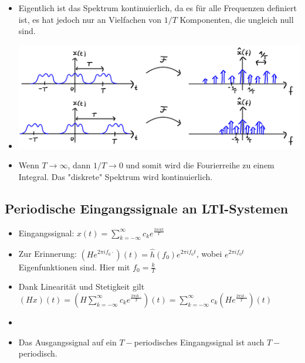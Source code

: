 \documentclass[11pt]{article}
\begin{document}
{\begin{itemize}[leftmargin=0pt]
\begin{itemize}
\begin{center}
        \end{center}
        \item[] Eigentlich ist das Spektrum kontinuierlich, da es für alle Frequenzen definiert ist, es hat jedoch nur an Vielfachen von $1/T$ Komponenten, die ungleich null sind.
        \item[] \begin{center}
            \includegraphics[width=0.8\linewidth]{docimgs/T_increase.jpg}
        \end{center}
        \item[] Wenn $T \to \infty$, dann $1/T \to 0$ und somit wird die Fourierreihe zu einem Integral. Das "diskrete" Spektrum wird kontinuierlich.
    \end{itemize}
     
\end{itemize}

\pagebreak

\subsection*{Periodische Eingangssignale an LTI-Systemen}
\begin{itemize}[leftmargin=0pt]
    \item[] Eingangssignal: $x(t) = \displaystyle\sum_{k = -\infty}^{\infty} c_k e^{\frac{2 \pi i k t}{T}}$
    \item[] Zur Erinnerung: $\left(H \displaystyle e^{2 \pi i f_0 \cdot}\right)(t) = \hat{h}(f_0) e^{2 \pi i f_0 t}$, wobei $e^{2 \pi i f_0 t}$ Eigenfunktionen sind. Hier mit $f_0 = \displaystyle\frac{k}{T}$
    \item[] Dank Linearität und Stetigkeit gilt $\left(H x\right)(t) = \left(H \displaystyle\sum_{k = -\infty}^{\infty} c_k e^{\frac{2 \pi i k \cdot}{T}}\right)(t) = \displaystyle\sum_{k = -\infty}^{\infty} c_k \left(He^{\frac{2 \pi i k \cdot}{T}}\right)(t)$
    \item[] %
    \item[] Das Ausgangssignal auf ein $T-$periodisches Eingangssignal ist auch $T-$periodisch.
\end{itemize}

}
\end{document}
